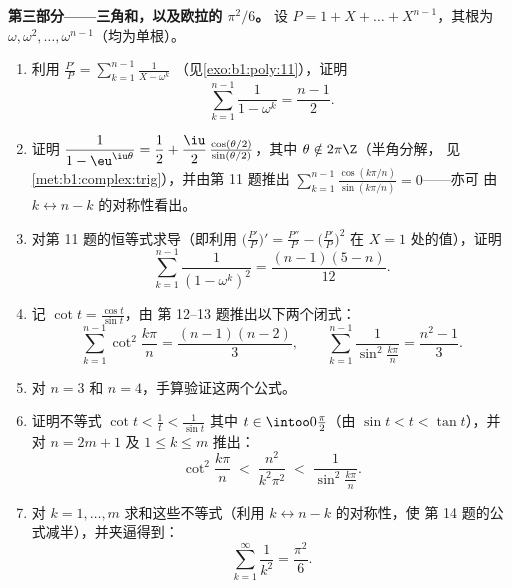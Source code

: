 \begin{problem}
\medskip
\noindent\textbf{第三部分——三角和，以及欧拉的
$\pi^2/6$。} 设 $P = 1 + X + \dots + X^{n-1}$，其根为
$\omega, \omega^2, \dots, \omega^{n-1}$（均为单根）。
\begin{enumerate}[resume]
  \item 利用 $\frac{P'}P = \sum_{k=1}^{n-1}\frac1{X - \omega^k}$
        （见\cref{exo:b1:poly:11}），证明
        \[
        \sum_{k=1}^{n-1}\frac{1}{1 - \omega^k} = \frac{n-1}2 .
        \]
  \item 证明 $\dfrac1{1 - \eu^{\iu\theta}} = \dfrac12 +
        \dfrac\iu2\,\frac{\cos(\theta/2)}{\sin(\theta/2)}$，其中
        $\theta \notin 2\pi\Z$（半角分解，
        见\cref{met:b1:complex:trig}），并由第 11 题推出
        $\sum_{k=1}^{n-1}
        \frac{\cos(k\pi/n)}{\sin(k\pi/n)} = 0$——亦可
        由 $k \leftrightarrow n - k$ 的对称性看出。
  \item 对第 11 题的恒等式求导（即利用
        $\bigl(\frac{P'}P\bigr)' = \frac{P''}P -
        \bigl(\frac{P'}P\bigr)^2$ 在 $X = 1$ 处的值），证明
        \[
        \sum_{k=1}^{n-1}\frac{1}{(1 - \omega^k)^2}
        = \frac{(n-1)(5-n)}{12} .
        \]
  \item 记 $\cot t = \frac{\cos t}{\sin t}$，由
        第 12--13 题推出以下两个闭式：
        \[
        \sum_{k=1}^{n-1}\cot^2\frac{k\pi}n = \frac{(n-1)(n-2)}3,
        \qquad
        \sum_{k=1}^{n-1}\frac1{\sin^2\frac{k\pi}n}
        = \frac{n^2-1}3 .
        \]
  \item 对 $n = 3$ 和 $n = 4$，手算验证这两个公式。
  \item 证明不等式 $\cot t < \frac1t < \frac1{\sin t}$
        其中 $t \in \intoo0{\frac\pi2}$（由 $\sin t < t < \tan
        t$），并对 $n = 2m + 1$ 及 $1 \leq k \leq m$ 推出：
        \[
        \cot^2\frac{k\pi}n \;<\; \frac{n^2}{k^2\pi^2}
        \;<\; \frac1{\sin^2\frac{k\pi}n} .
        \]
  \item 对 $k = 1, \dots, m$ 求和这些不等式（利用
        $k \leftrightarrow n - k$ 的对称性，使
        第 14 题的公式减半），并夹逼得到：
        \[
        \sum_{k=1}^{\infty}\frac1{k^2} = \frac{\pi^2}6 .
        \]
\end{enumerate}


\end{problem}
